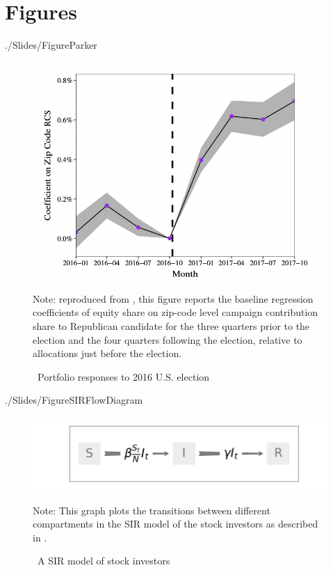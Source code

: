 \section*{Figures}


\begin{verbatimwrite}{./Slides/FigureParker}%
\begin{figure}[!ht] \centering  %
	\caption{ ~Portfolio responses to 2016 U.S. election}
	\label{fig:parker}
	\centerline{\includegraphics[width=\textwidth]{./figures/parker.png}}
	\begin{flushleft}
		{\footnotesize Note: reproduced from \cite{meeuwis2018belief}, this figure reports the baseline regression coefficients of equity share on zip-code level  campaign contribution share to Republican candidate for the three quarters prior to the election and the four quarters following the election, relative to allocations just before the election.}
	\end{flushleft}
\end{figure}
\end{verbatimwrite}%



\begin{verbatimwrite}{./Slides/FigureSIRFlowDiagram}%
\begin{figure}[!ht] \centering  %
	\caption{ ~A SIR model of stock investors}
		\label{fig:sir_diagram}
		\centerline{\includegraphics[width=\textwidth]{./figures/flow_diagram.png}}
		\begin{flushleft}
		{\footnotesize Note: This graph plots the transitions between different compartments in the SIR model of the stock investors as described in \cite{shiller1989survey}. }
			\end{flushleft}
	\end{figure}
\end{verbatimwrite}%


